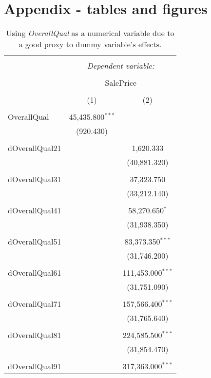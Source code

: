 \documentclass{article}
\begin{document}
\section{Appendix - tables and figures}
\begin{table}[t]
\centering
\caption{\label{tab:overallqualldummy} Using \emph{OverallQual} as a numerical variable due to a good proxy to dummy variable's effects.}
\begin{tabular}{@{\extracolsep{5pt}}lcc} 
\\[-1.8ex]\hline 
\hline \\[-1.8ex] 
 & \multicolumn{2}{c}{\textit{Dependent variable:}} \\ 
\cline{2-3} 
\\[-1.8ex] & \multicolumn{2}{c}{SalePrice} \\ 
\\[-1.8ex] & (1) & (2)\\ 
\hline \\[-1.8ex] 
 OverallQual & 45,435.800$^{***}$ &  \\ 
  & (920.430) &  \\ 
  & & \\ 
 dOverallQual21 &  & 1,620.333 \\ 
  &  & (40,881.320) \\ 
  & & \\ 
 dOverallQual31 &  & 37,323.750 \\ 
  &  & (33,212.140) \\ 
  & & \\ 
 dOverallQual41 &  & 58,270.650$^{*}$ \\ 
  &  & (31,938.350) \\ 
  & & \\ 
 dOverallQual51 &  & 83,373.350$^{***}$ \\ 
  &  & (31,746.200) \\ 
  & & \\ 
 dOverallQual61 &  & 111,453.000$^{***}$ \\ 
  &  & (31,751.090) \\ 
  & & \\ 
 dOverallQual71 &  & 157,566.400$^{***}$ \\ 
  &  & (31,765.640) \\ 
  & & \\ 
 dOverallQual81 &  & 224,585.500$^{***}$ \\ 
  &  & (31,854.470) \\ 
  & & \\ 
 dOverallQual91 &  & 317,363.000$^{***}$ \\ 

\end{tabular}
\end{table}
\end{document}
